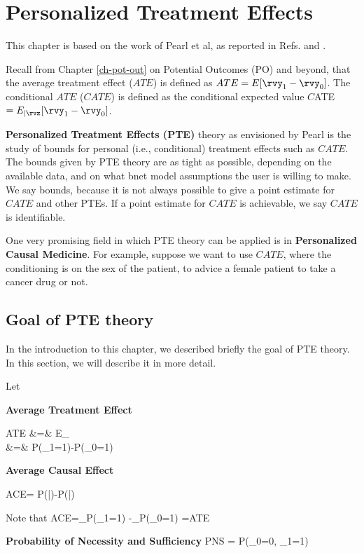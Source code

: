 \chapter{Personalized Treatment Effects}
\label{ch-personalized}


This chapter
is based on the work of Pearl et al, as reported in
Refs.
\cite{pearl-tian-2000} and
\cite{personalized-pearl-2021}.

Recall from Chapter \ref{ch-pot-out}
on Potential Outcomes (PO) 
and beyond, that
the average treatment effect ($ATE$) 
is defined as
$ATE=E[\rvy_1-\rvy_0]$.
The conditional $ATE$ ($CATE$) is defined as
the conditional expected value
$C$ATE$=E_{|\rvz}[\rvy_1-\rvy_0]$.


{\bf
Personalized Treatment Effects (PTE)}
theory
as envisioned by Pearl
is the study 
of
bounds
for personal (i.e., conditional)
 treatment
effects such as $CATE$. The
bounds given by PTE theory
are
as tight as possible,
depending on 
the available data,
and on what bnet model 
assumptions
the user is willing to make.
We say bounds, because 
it is not always possible
to give a point estimate
for $CATE$ and other
PTEs.
If a point estimate for $CATE$
is achievable, we say $CATE$
is identifiable.

One 
very promising
field in 
which PTE theory
can be applied
is in {\bf Personalized Causal Medicine}.
For example, suppose we want to
 use $CATE$, 
where the conditioning is on the
sex of the patient,
to advice a female  patient
to take a cancer drug or not.

\section{Goal of PTE theory}
In the introduction
to this chapter,
we described 
briefly
the goal of PTE theory. 
In this section,
we will describe it
in more detail.

Let

{\bf Average Treatment Effect}


\beqa
ATE &=& E_\s[y^\s_1-y^\s_0]
\\
&=&
P(\rvy_1=1)-P(\rvy_0=1)
\eeqa

{\bf Average Causal Effect}

\beq
ACE= P(|\cald{})-P(|\cald{})
\eeq

Note that
\beq
ACE=_{P(\rvy_1=1)}
-_{P(\rvy_0=1)}
=ATE\eeq


{\bf Probability of Necessity and Sufficiency}
\beq
PNS = P(\rvy_0=0, \rvy_1=1)
\eeq

